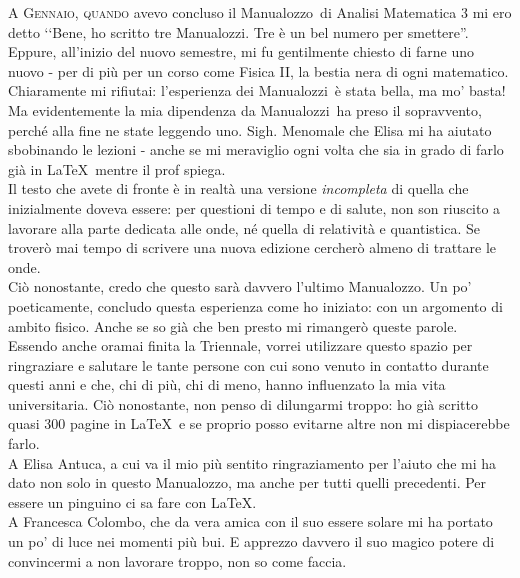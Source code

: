 \lettrine[findent=1pt, nindent=0pt]{A}{ Gennaio, quando} avevo concluso il Manualozzo\texttrademark\ di Analisi Matematica 3 mi ero detto ‘‘Bene, ho scritto tre Manualozzi\texttrademark. Tre è un bel numero per smettere''.\\
Eppure, all'inizio del nuovo semestre, mi fu gentilmente chiesto di farne uno nuovo - per di più per un corso come Fisica II, la bestia nera di ogni matematico. Chiaramente mi rifiutai: l'esperienza dei Manualozzi\texttrademark\ è stata bella, ma mo' basta! Ma evidentemente la mia dipendenza da Manualozzi\texttrademark\ ha preso il sopravvento, perché alla fine ne state leggendo uno. Sigh. Menomale che Elisa mi ha aiutato sbobinando le lezioni - anche se mi meraviglio ogni volta che sia in grado di farlo già in \LaTeX\ mentre il prof spiega.\\
\newline
\noindent Il testo che avete di fronte è in realtà una versione \textit{incompleta} di quella che inizialmente doveva essere: per questioni di tempo e di salute, non son riuscito a lavorare alla parte dedicata alle onde, né quella di relatività e quantistica. Se troverò mai tempo di scrivere una nuova edizione cercherò almeno di trattare le onde.\\
Ciò nonostante, credo che questo sarà davvero l'ultimo Manualozzo\texttrademark. Un po' poeticamente, concludo questa esperienza come ho iniziato: con un argomento di ambito fisico. Anche se so già che ben presto mi rimangerò queste parole.\\
\newline
\noindent Essendo anche oramai finita la Triennale, vorrei utilizzare questo spazio per ringraziare e salutare le tante persone con cui sono venuto in contatto durante questi anni e che, chi di più, chi di meno, hanno influenzato la mia vita universitaria. Ciò nonostante, non penso di dilungarmi troppo: ho già scritto quasi 300 pagine in \LaTeX\ e se proprio posso evitarne altre non mi dispiacerebbe farlo.\\
\newline
A Elisa Antuca, a cui va il mio più sentito ringraziamento per l'aiuto che mi ha dato non solo in questo Manualozzo\texttrademark, ma anche per tutti quelli precedenti. Per essere un pinguino ci sa fare con \LaTeX.\\
A Francesca Colombo, che da vera amica con il suo essere solare mi ha portato un po' di luce nei momenti più bui. E apprezzo davvero il suo magico potere di convincermi a non lavorare troppo, non so come faccia.\\
